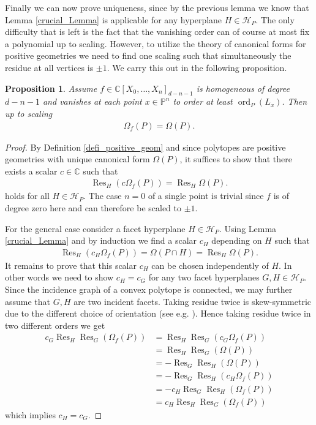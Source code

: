 \documentclass[a4paper,10pt]{amsart}
\theoremstyle{definition}
\theoremstyle{plain}
\newtheorem{prop}[defin]{Proposition}
\newcommand{\Res}{\operatorname{Res}}
\newcommand{\ord}{\operatorname{ord}}
\newcommand{\cH}{{\mathcal H}}
\newcommand{\C}{{\mathbb C}}
\newcommand{\pp}{\mathbb{P}}
\begin{document}
Finally we can now prove uniqueness, since by the previous lemma we know that Lemma \ref{crucial_Lemma} is applicable for any hyperplane $H\in \cH_P$. The only difficulty that is left is the fact that the vanishing order can of course at most fix a polynomial up to scaling. However, to utilize the theory of canonical forms for positive geometries we need to find one scaling such that simultaneously the residue at all vertices is $\pm 1$. We carry this out in the following proposition.

\begin{prop}
\label{dealing with scalings}
    Assume $f\in \C[X_0,\ldots,X_n]_{d-n-1}$ is homogeneous of degree $d-n-1$ and vanishes at each point $x\in \pp^n$ to order at least $\ord_P(L_x)$. Then up to scaling \begin{align*}
        \Omega_f(P)=\Omega(P).
    \end{align*}
\end{prop}
\begin{proof}
    By Definition \ref{defi_positive_geom} and since polytopes are positive geometries with unique canonical form $\Omega(P)$, it suffices to show that there exists a scalar $c\in \C$ such that \begin{align*}
        \Res_H(c\Omega_f(P))=\Res_H\Omega(P).
    \end{align*} 
    holds for all $H\in \cH_P$.
    The case $n=0$ of a single point is trivial since $f$ is of degree zero here and can therefore be scaled to $\pm 1$.

    For the general case consider a facet hyperplane $H\in \cH_P$. Using Lemma \ref{crucial_Lemma} and by induction we find a scalar $c_H$ depending on $H$ such that 
    \begin{align*}
        \Res_H(c_H\Omega_f(P))=\Omega(P\cap H)=\Res_H\Omega(P).
    \end{align*}
    It remains to prove that this scalar $c_H$ can be chosen independently of $H$. In other words we need to show $c_H=c_G$ for any two facet hyperplanes $G,H\in \cH_P$. Since the incidence graph of a convex polytope is connected, we may further assume that $G,H$ are two incident facets. 
    Taking residue twice is skew-symmetric due to the different choice of orientation (see e.g. \cite[p.~27]{CattaniDickenstein2005Residues}). Hence taking residue twice in two different orders we get \begin{align*}
        c_G\Res_H\Res_G(\Omega_f(P))&=\Res_H\Res_G(c_G\Omega_f(P))\\&=\Res_H\Res_G(\Omega(P))\\&=-\Res_G\Res_H(\Omega(P))\\&= -\Res_G\Res_H(c_H\Omega_f(P))\\
        &=-c_H\Res_G\Res_H(\Omega_f(P))\\
        &=c_H\Res_H\Res_G(\Omega_f(P))
    \end{align*}
    which implies $c_H=c_G$.
\end{proof}
\end{document}
